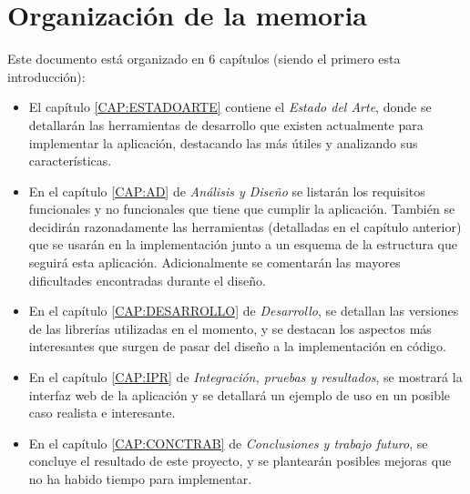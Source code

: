   
  \section{Organización de la memoria\label{SEC:ORGANIZACION}}
    Este documento está organizado en 6 capítulos (siendo el primero esta introducción): 
    \begin{itemize}
      \item El capítulo \ref{CAP:ESTADOARTE} contiene el \textit{Estado del Arte}, donde se detallarán las herramientas de desarrollo que existen actualmente para implementar la aplicación, destacando las más útiles y analizando sus características.
      
      \item En el capítulo \ref{CAP:AD} de \textit{Análisis y Diseño} se listarán los requisitos funcionales y no funcionales que tiene que cumplir la aplicación. También se decidirán razonadamente las herramientas (detalladas en el capítulo anterior) que se usarán en la implementación junto a un esquema de la estructura que seguirá esta aplicación. Adicionalmente se comentarán las mayores dificultades encontradas durante el diseño.
      
      \item En el capítulo \ref{CAP:DESARROLLO} de \textit{Desarrollo}, se detallan las versiones de las librerías utilizadas en el momento, y se destacan los aspectos más interesantes que surgen de pasar del diseño a la implementación en código.
      
      \item En el capítulo \ref{CAP:IPR} de \textit{Integración, pruebas y resultados}, se mostrará la interfaz web de la aplicación y se detallará un ejemplo de uso en un posible caso realista e interesante.
      
      \item En el capítulo \ref{CAP:CONCTRAB} de \textit{Conclusiones y trabajo futuro}, se concluye el resultado de este proyecto, y se plantearán posibles mejoras que no ha habido tiempo para implementar.
    \end{itemize}
    
    

